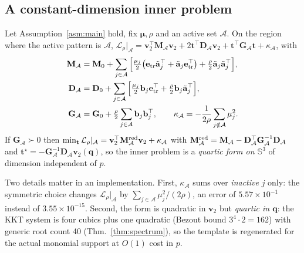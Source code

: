 \subsection{A constant-dimension inner problem}\label{sec:dim}
\begin{theorem}\label{thm:dim}
Let Assumption~\ref{asm:main} hold, fix $\boldsymbol\mu,\rho$ and an active set $\mathcal A$. On the region where the active pattern is $\mathcal A$, $\mathcal L_\rho|_{\mathcal A}=\mathbf v_2^\top\mathbf M_{\mathcal A}\mathbf v_2+2\mathbf t^\top\mathbf D_{\mathcal A}\mathbf v_2+\mathbf t^\top\mathbf G_{\mathcal A}\mathbf t+\kappa_{\mathcal A}$, with
\begin{equation}
\begin{aligned}
\mathbf M_{\mathcal A}&=\mathbf M_0+\sum_{j\in\mathcal A}\Big[\tfrac{\mu_j}{2}\big(\mathbf e_{\rm tr}\tilde{\mathbf a}_j^\top+\tilde{\mathbf a}_j\mathbf e_{\rm tr}^\top\big)+\tfrac{\rho}{2}\tilde{\mathbf a}_j\tilde{\mathbf a}_j^\top\Big],\\
\mathbf D_{\mathcal A}&=\mathbf D_0+\sum_{j\in\mathcal A}\Big[\tfrac{\mu_j}{2}\mathbf b_j\mathbf e_{\rm tr}^\top+\tfrac{\rho}{2}\mathbf b_j\tilde{\mathbf a}_j^\top\Big],\\
\mathbf G_{\mathcal A}&=\mathbf G_0+\tfrac{\rho}{2}\sum_{j\in\mathcal A}\mathbf b_j\mathbf b_j^\top,\qquad
\kappa_{\mathcal A}=-\frac{1}{2\rho}\sum_{j\notin\mathcal A}\mu_j^2 .
\end{aligned}
\label{eq:MA}
\end{equation}
If $\mathbf G_{\mathcal A}\succ0$ then $\min_{\mathbf t}\mathcal L_\rho|_{\mathcal A}=\mathbf v_2^\top\mathbf M^{\rm red}_{\mathcal A}\mathbf v_2+\kappa_{\mathcal A}$ with $\mathbf M^{\rm red}_{\mathcal A}=\mathbf M_{\mathcal A}-\mathbf D_{\mathcal A}^\top\mathbf G_{\mathcal A}^{-1}\mathbf D_{\mathcal A}$ and $\mathbf t^\star=-\mathbf G_{\mathcal A}^{-1}\mathbf D_{\mathcal A}\mathbf v_2(\mathbf q)$, so the inner problem is a \emph{quartic form on $\mathbb{S}^3$} of dimension independent of $p$.
\end{theorem}
Two details matter in an implementation. First, $\kappa_{\mathcal A}$ sums over \emph{inactive} $j$ only: the symmetric choice changes $\mathcal L_\rho|_{\mathcal A}$ by $\sum_{j\in\mathcal A}\mu_j^2/(2\rho)$, an error of $5.57\times10^{-1}$ instead of $3.55\times10^{-15}$. Second, the form is quadratic in $\mathbf v_2$ but \emph{quartic in $\mathbf q$}: the KKT system is four cubics plus one quadratic (Bezout bound $3^4\cdot2=162$) with generic root count 40 (Thm.~\ref{thm:spectrum}), so the template is regenerated for the actual monomial support at $O(1)$ cost in $p$.

